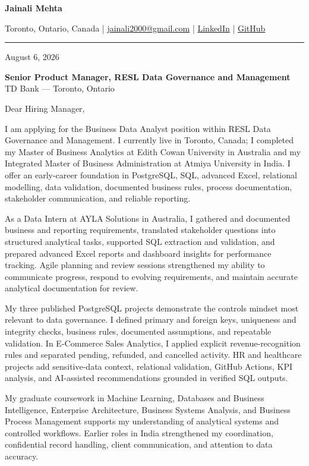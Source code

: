 \documentclass[letterpaper,10pt]{article}
\begin{document}
\begin{center}
  {\fontsize{17}{19}\selectfont\textbf{Jainali Mehta}}\par\vspace{2pt}
  \small Toronto, Ontario, Canada \;|\;
  \href{mailto:jainali2000@gmail.com}{jainali2000@gmail.com} \;|\;
  \href{https://www.linkedin.com/in/jainali-mehta}{LinkedIn} \;|\;
  \href{https://github.com/jainalimehta}{GitHub}
\end{center}
\vspace{-5pt}
\noindent\rule{\textwidth}{0.4pt}

August 6, 2026

\textbf{Senior Product Manager, RESL Data Governance and Management}\\
TD Bank --- Toronto, Ontario

Dear Hiring Manager,

I am applying for the Business Data Analyst position within RESL Data Governance and Management. I currently live in Toronto, Canada; I completed my Master of Business Analytics at Edith Cowan University in Australia and my Integrated Master of Business Administration at Atmiya University in India. I offer an early-career foundation in PostgreSQL, SQL, advanced Excel, relational modelling, data validation, documented business rules, process documentation, stakeholder communication, and reliable reporting.

As a Data Intern at AYLA Solutions in Australia, I gathered and documented business and reporting requirements, translated stakeholder questions into structured analytical tasks, supported SQL extraction and validation, and prepared advanced Excel reports and dashboard insights for performance tracking. Agile planning and review sessions strengthened my ability to communicate progress, respond to evolving requirements, and maintain accurate analytical documentation for review.

My three published PostgreSQL projects demonstrate the controls mindset most relevant to data governance. I defined primary and foreign keys, uniqueness and integrity checks, business rules, documented assumptions, and repeatable validation. In E-Commerce Sales Analytics, I applied explicit revenue-recognition rules and separated pending, refunded, and cancelled activity. HR and healthcare projects add sensitive-data context, relational validation, GitHub Actions, KPI analysis, and AI-assisted recommendations grounded in verified SQL outputs.

My graduate coursework in Machine Learning, Databases and Business Intelligence, Enterprise Architecture, Business Systems Analysis, and Business Process Management supports my understanding of analytical systems and controlled workflows. Earlier roles in India strengthened my coordination, confidential record handling, client communication, and attention to data accuracy.
\end{document}
